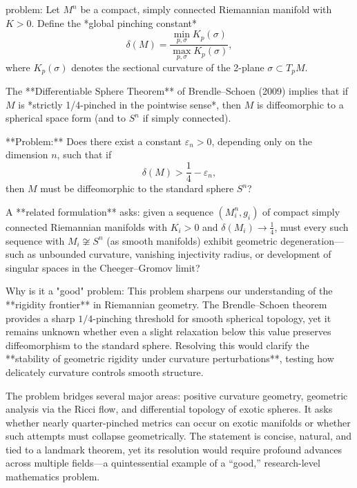 problem:  
Let \( M^n \) be a compact, simply connected Riemannian manifold with \( K>0 \).  
Define the *global pinching constant*  
\[
\delta(M) = \frac{\min_{p,\sigma} K_p(\sigma)}{\max_{p,\sigma} K_p(\sigma)},
\]
where \(K_p(\sigma)\) denotes the sectional curvature of the 2-plane \(\sigma \subset T_pM\).  

The **Differentiable Sphere Theorem** of Brendle–Schoen (2009) implies that if \(M\) is *strictly 1/4-pinched in the pointwise sense*, then \(M\) is diffeomorphic to a spherical space form (and to \(S^n\) if simply connected).  

**Problem:**  
Does there exist a constant \(\varepsilon_n>0\), depending only on the dimension \(n\), such that if  
\[
\delta(M) > \frac{1}{4} - \varepsilon_n,
\]  
then \(M\) must be diffeomorphic to the standard sphere \(S^n\)?  

A **related formulation** asks: given a sequence \((M_i^n,g_i)\) of compact simply connected Riemannian manifolds with \(K_i>0\) and \(\delta(M_i) \to \frac{1}{4}\), must every such sequence with \(M_i \not\cong S^n\) (as smooth manifolds) exhibit geometric degeneration—such as unbounded curvature, vanishing injectivity radius, or development of singular spaces in the Cheeger–Gromov limit?

Why is it a "good" problem:  
This problem sharpens our understanding of the **rigidity frontier** in Riemannian geometry. The Brendle–Schoen theorem provides a sharp \(1/4\)-pinching threshold for smooth spherical topology, yet it remains unknown whether even a slight relaxation below this value preserves diffeomorphism to the standard sphere. Resolving this would clarify the **stability of geometric rigidity under curvature perturbations**, testing how delicately curvature controls smooth structure.  

The problem bridges several major areas: positive curvature geometry, geometric analysis via the Ricci flow, and differential topology of exotic spheres. It asks whether nearly quarter-pinched metrics can occur on exotic manifolds or whether such attempts must collapse geometrically. The statement is concise, natural, and tied to a landmark theorem, yet its resolution would require profound advances across multiple fields—a quintessential example of a “good,” research-level mathematics problem.